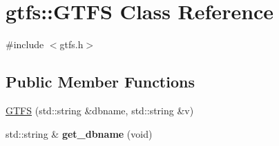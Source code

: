 \hypertarget{classgtfs_1_1GTFS}{}\section{gtfs\+:\+:G\+T\+FS Class Reference}
\label{classgtfs_1_1GTFS}


{\ttfamily \#include $<$gtfs.\+h$>$}

\subsection*{Public Member Functions}
\begin{DoxyCompactItemize}
\item 
\hyperlink{classgtfs_1_1GTFS_abe065541610fe5d9673bc4befd0bcf94}{G\+T\+FS} (std\+::string \&dbname, std\+::string \&v)
\item 
std\+::string \& {\bfseries get\+\_\+dbname} (void)\hypertarget{classgtfs_1_1GTFS_a40054a8e935d46bb372538a4b3d8e262}{}\label{classgtfs_1_1GTFS_a40054a8e935d46bb372538a4b3d8e262}


\end{DoxyCompactItemize}

